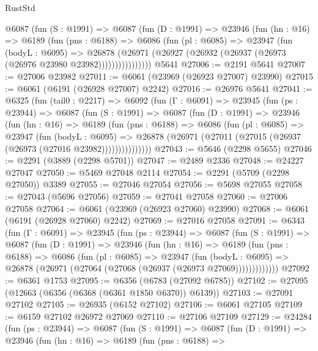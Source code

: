 \begin{lexlean}{RustStd}
\begin{coremodule}
{\begin{coremodule}
{{{{{{{{{{{{{{{{{{{{{{{{{{          @6087
            (fun (S : @1991) =>
            @6087
              (fun (D : @1991) =>
              @23946
                (fun (hn : @16) =>
                @6189
                  (fun (pns : @6188) =>
                  @6086
                    (fun (pl : @6085) =>
                    @23947
                      (fun (bodyL : @6095) =>
                      @26878
                        (@26971
                          (@26927 (@26932 (@26937 (@26973 (@26976 @23980 @23982))))))))))))))))
    @5641
@27006 := @2191 @5641
@27007 := @27006 @23982
@27011 := @6061 (@23969 (@26923 @27007) @23990)
@27015 := @6061 (@6191 (@26928 @27007) @2242)
@27016 := @26976 @5641
@27041 := @6325
    (fun (tail0 : @2217) =>
    @6092
      (fun (Γ : @6091) =>
      @23945
        (fun (ps : @23944) =>
        @6087
          (fun (S : @1991) =>
          @6087
            (fun (D : @1991) =>
            @23946
              (fun (hn : @16) =>
              @6189
                (fun (pns : @6188) =>
                @6086
                  (fun (pl : @6085) =>
                  @23947
                    (fun (bodyL : @6095) =>
                    @26878 (@26971 (@27011 (@27015 (@26937 (@26973 (@27016 @23982)))))))))))))))
@27043 := @5646 (@2298 @5655)
@27046 := @2291 (@3889 (@2298 @5701))
@27047 := @2489 @2336
@27048 := @24227 @27047
@27050 := @5469 @27048 @2114
@27054 := @2291 (@5709 (@2298 @27050)) @3389
@27055 := @27046 @27054
@27056 := @5698 @27055
@27058 := @27043 (@5696 @27056)
@27059 := @27041 @27058
@27060 := @27006 @27058
@27064 := @6061 (@23969 (@26923 @27060) @23990)
@27068 := @6061 (@6191 (@26928 @27060) @2242)
@27069 := @27016 @27058
@27091 := @6343
    (fun (Γ : @6091) =>
    @23945
      (fun (ps : @23944) =>
      @6087
        (fun (S : @1991) =>
        @6087
          (fun (D : @1991) =>
          @23946
            (fun (hn : @16) =>
            @6189
              (fun (pns : @6188) =>
              @6086
                (fun (pl : @6085) =>
                @23947
                  (fun (bodyL : @6095) =>
                  @26878 (@26971 (@27064 (@27068 (@26937 (@26973 @27069)))))))))))))
@27092 := @6361 @1753
@27095 := @6356 (@6783 (@27092 @6785))
@27102 := @27095 (@12663 (@6356 (@6368 (@6361 @1850 @6370)) @6139))
@27103 := @27091 @27102
@27105 := @26935 (@6152 @27102)
@27106 := @6061 @27105
@27109 := @6159 @27102 @26972 @27069
@27110 := @27106 @27109
@27129 := @24284
    (fun (ps : @23944) =>
    @6087
      (fun (S : @1991) =>
      @6087
        (fun (D : @1991) =>
        @23946
          (fun (hn : @16) =>
          @6189
            (fun (pns : @6188) =>
}}}}}}}}}}}}}}}}}}}}}}}}}}
\end{coremodule}}
\end{coremodule}
\end{lexlean}
